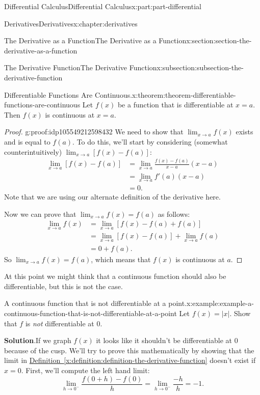 \documentclass[twoside,10pt,]{book}
\newcommand{\blocktitlefont}{\relax}
\newcommand{\xreffont}{\relax}
\numberwithin{equation}{part}
\begin{document}
\begin{partptx}{Differential Calculus}{}{Differential Calculus}{}{}{x:part:part-differential}
\begin{chapterptx}{Derivatives}{}{Derivatives}{}{}{x:chapter:derivatives}
\begin{sectionptx}{The Derivative as a Function}{}{The Derivative as a Function}{}{}{x:section:section-the-derivative-as-a-function}
\begin{subsectionptx}{The Derivative Function}{}{The Derivative Function}{}{}{x:subsection:subsection-the-derivative-function}
\begin{theorem}{Differentiable Functions Are Continuous.}{}{x:theorem:theorem-differentiable-functions-are-continuous}%
Let \(f(x)\) be a function that is differentiable at \(x=a\). Then \(f(x)\) is continuous at \(x=a\).%
\end{theorem}
\begin{proof}{}{g:proof:idp105549212598432}
We need to show that \(\lim_{x\to a}f(x)\) exists and is equal to \(f(a)\). To do this, we'll start by considering (somewhat counterintuitively) \(\lim_{x\to a}[f(x)-f(a)]\):%
\begin{align*}
\lim_{x\to a}[f(x)-f(a)] & = \lim_{x\to a}\frac{f(x)-f(a)}{x-a}(x-a) \\
& = \lim_{x\to a}f'(a)(x-a) \\
& = 0. 
\end{align*}
Note that we are using our alternate definition of the derivative here.%
\par
Now we can prove that \(\lim_{x\to a}f(x) = f(a)\) as follows:%
\begin{align*}
\lim_{x\to a}f(x) & = \lim_{x\to a}[f(x) - f(a) + f(a)] \\
& = \lim_{x\to a}[f(x)-f(a)] + \lim_{x\to a}f(a) \\
& = 0 + f(a). 
\end{align*}
So \(\lim_{x\to a}f(x) = f(a)\), which means that \(f(x)\) is continuous at \(a\).%
\end{proof}
At this point we might think that a continuous function should also be differentiable, but this is not the case.%
\begin{example}{A continuous function that is not differentiable at a point.}{x:example:example-a-continuous-function-that-is-not-differentiable-at-a-point}%
Let \(f(x) = |x|\). Show that \(f\) is \emph{not} differentiable at \(0\).%
\par\smallskip%
\noindent\textbf{\blocktitlefont Solution}.\hypertarget{g:solution:idp105549212606624}{}\quad{}If we graph \(f(x)\) it looks like it shouldn't be differentiable at \(0\) because of the cusp. We'll try to prove this mathematically by showing that the limit in \hyperref[x:definition:definition-the-derivative-function]{Definition~{\xreffont\ref{x:definition:definition-the-derivative-function}}} doesn't exist if \(x=0\). First, we'll compute the left hand limit:%
\begin{equation*}
\lim_{h\to0^{-}}\frac{f(0+h)-f(0)}{h} = \lim_{h\to0^{-}}\frac{-h}{h} = -1.
\end{equation*}

\end{example}
\end{subsectionptx}
\end{sectionptx}
\end{chapterptx}
\end{partptx}
\end{document}
